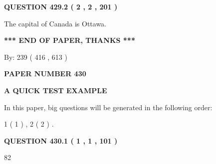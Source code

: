 \documentclass[12pt]{article}
\begin{document}
{\textbf{\Large{QUESTION
429.2 
 ( 2 , 2 , 201 )
}}}
  
  
 
 
\noindent{}
 
 
The capital of Canada is Ottawa.
 
 
 
 
   
   
 \vspace{0.2in}
 
   
   
   
   
\vspace{1.0in} 
{\textbf{\large{ *** END OF PAPER, THANKS *** }}} 
   
   
\hspace{1.0in} By: 
 239 ( 416 ,  613 )
   
   
   
   
\newpage 
\setcounter{page}{ 
   430001 } 
   
   
   
   
 {\textbf{ \Large{ PAPER NUMBER  430  }}}
   
   
\vspace{0.2in}
   
   
   
   
   
   
 \vspace{0.2in}
{\LARGE {\textbf{ A QUICK TEST EXAMPLE}}}
   
   
   
\vspace{0.2in}
   
In this paper, big questions will be generated in the following order: 
   
   
   1 ( 1 )
 ,
   2 ( 2 )
 .
  
\vspace{0.2in}
  
{\textbf{\Large{QUESTION
430.1 
 ( 1 , 1 , 101 )
}}}
  
  
 
 
\noindent{}

82
 
 
 
 
\noindent{}
\end{document}

